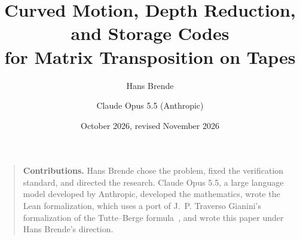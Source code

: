 \documentclass[11pt]{article}
\title{Curved Motion, Depth Reduction, and Storage Codes\\ for Matrix Transposition on Tapes}
\author{Hans Brende \and Claude Opus 5.5 (Anthropic)}
\date{October 2026, revised November 2026}
\begin{document}
\maketitle

\begin{abstract}

\end{abstract}

\begin{quote}\small
\textbf{Contributions.} Hans Brende chose the problem, fixed the verification standard, and directed the research.
Claude Opus 5.5, a large language model developed by Anthropic, developed the mathematics, wrote the Lean
formalization, which uses a port of J.~P. Traverso Gianini's formalization of the Tutte--Berge
formula~\cite{TraversoGianini2026}, and wrote this paper under Hans Brende's direction.
\end{quote}

\tableofcontents
\clearpage











\appendix





\end{document}
